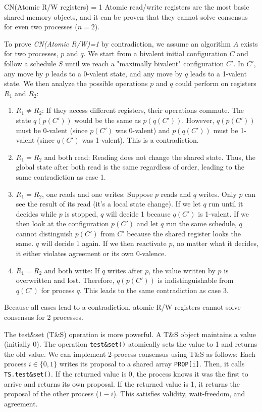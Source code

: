 \begin{Thm}{CN(Atomic R/W registers) = 1}{}
Atomic read/write registers are the most basic shared memory objects, and it can be proven that they cannot solve consensus for even two processes ($n=2$).
\begin{demonstration}
To prove \textit{CN(Atomic R/W)=1} by contradiction, we assume an algorithm $A$ exists for two processes, $p$ and $q$. We start from a bivalent initial configuration $C$ and follow a schedule $S$ until we reach a "maximally bivalent" configuration $C'$. In $C'$, any move by $p$ leads to a 0-valent state, and any move by $q$ leads to a 1-valent state. We then analyze the possible operations $p$ and $q$ could perform on registers $R_1$ and $R_2$:
\begin{enumerate}
    \item $R_1\neq R_2$: If they access different registers, their operations commute. The state $q(p(C'))$ would be the same as $p(q(C'))$. However, $q(p(C'))$ must be 0-valent (since $p(C')$ was 0-valent) and $p(q(C'))$ must be 1-valent (since $q(C')$ was 1-valent). This is a contradiction.
    \item $R_1=R_2$ and both read: Reading does not change the shared state. Thus, the global state after both read is the same regardless of order, leading to the same contradiction as case 1.
    \item $R_1=R_2$, one reads and one writes: Suppose $p$ reads and $q$ writes. Only $p$ can see the result of its read (it's a local state change). If we let $q$ run until it decides while $p$ is stopped, $q$ will decide 1 because $q(C')$ is 1-valent. If we then look at the configuration $p(C')$ and let $q$ run the same schedule, $q$ cannot distinguish $p(C')$ from $C'$ because the shared register looks the same. $q$ will decide 1 again. If we then reactivate $p$, no matter what it decides, it either violates agreement or its own 0-valence.
    \item $R_1=R_2$ and both write: If $q$ writes after $p$, the value written by $p$ is overwritten and lost. Therefore, $q(p(C'))$ is indistinguishable from $q(C')$ for process $q$. This leads to the same contradiction as case 3.
\end{enumerate}

Because all cases lead to a contradiction, atomic R/W registers cannot solve consensus for 2 processes.
\end{demonstration}
\end{Thm}

The test\&set (T\&S) operation is more powerful. A T\&S object maintains a value (initially 0). The operation \texttt{test\&set()} atomically sets the value to 1 and returns the old value. We can implement 2-process consensus using T\&S as follows:
Each process $i\in\{0,1\}$ writes its proposal to a shared array \texttt{PROP[i]}. Then, it calls \texttt{TS.test\&set()}. If the returned value is 0, the process knows it was the first to arrive and returns its own proposal. If the returned value is 1, it returns the proposal of the other process ($1-i$). This satisfies validity, wait-freedom, and agreement.

